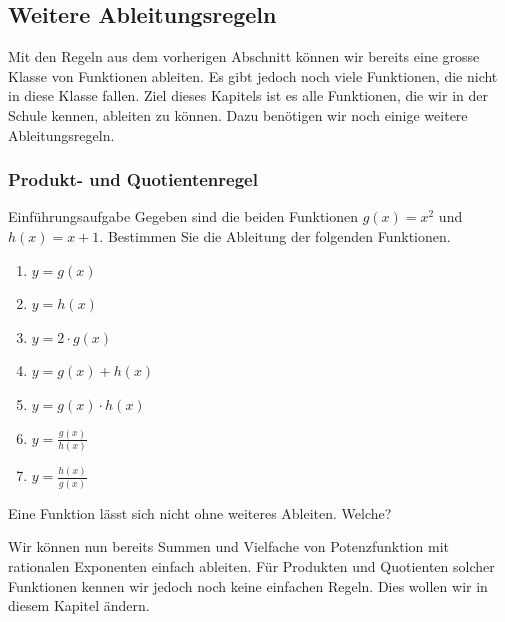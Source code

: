 






























































\clearpage
\subsection{Weitere Ableitungsregeln}
Mit den Regeln aus dem vorherigen Abschnitt können wir bereits eine grosse Klasse von Funktionen ableiten. Es gibt jedoch noch viele Funktionen, die nicht in diese Klasse fallen. Ziel dieses Kapitels ist es alle Funktionen, die wir in der Schule kennen, ableiten zu können. Dazu benötigen wir noch einige weitere Ableitungsregeln.
\subsubsection{Produkt- und Quotientenregel}
\begin{LA}
	{Einführungsaufgabe}{}
	Gegeben sind die beiden Funktionen $g(x)=x^2$ und $h(x)=x+1$. Bestimmen Sie die Ableitung der folgenden Funktionen.
	\begin{enumerate}
		\item $y=g(x)$
		\item $y=h(x)$
		\item $y=2\cdot g(x)$
		\item $y=g(x)+h(x)$
		\item $y=g(x)\cdot h(x)$
		\item $y=\frac{g(x)}{h(x)}$
		\item $y=\frac{h(x)}{g(x)}$
	\end{enumerate}
	Eine Funktion lässt sich nicht ohne weiteres Ableiten. Welche?
\end{LA}
\clearpage
Wir können nun bereits Summen und Vielfache von Potenzfunktion mit rationalen Exponenten einfach ableiten. Für Produkten und Quotienten solcher Funktionen kennen wir jedoch noch keine einfachen Regeln. Dies wollen wir in diesem Kapitel ändern.

